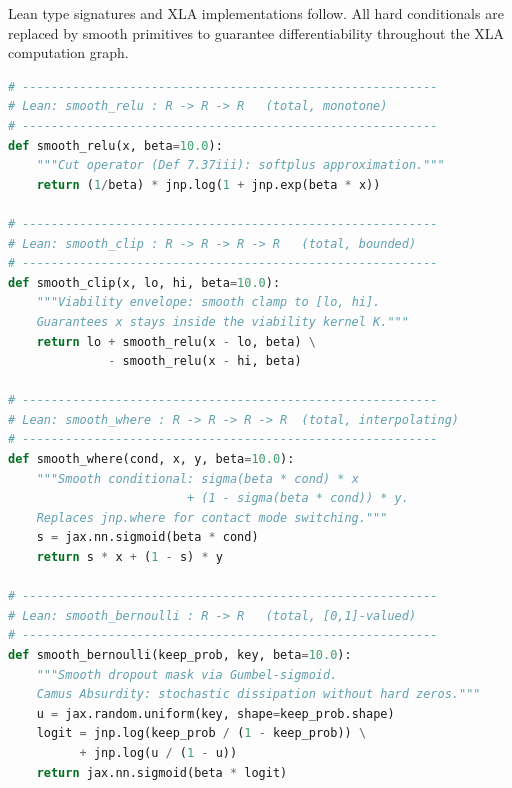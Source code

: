 \documentclass[11pt,a4paper]{article}
\theoremstyle{definition}
\theoremstyle{remark}
\begin{document}
Lean type signatures and XLA implementations follow. All hard conditionals are replaced by smooth primitives to guarantee differentiability throughout the XLA computation graph.

\begin{lstlisting}[language=Python,caption={Smooth primitives (differentiable everywhere under custom JVP)}]
# ----------------------------------------------------------
# Lean: smooth_relu : R -> R -> R   (total, monotone)
# ----------------------------------------------------------
def smooth_relu(x, beta=10.0):
    """Cut operator (Def 7.37iii): softplus approximation."""
    return (1/beta) * jnp.log(1 + jnp.exp(beta * x))

# ----------------------------------------------------------
# Lean: smooth_clip : R -> R -> R -> R   (total, bounded)
# ----------------------------------------------------------
def smooth_clip(x, lo, hi, beta=10.0):
    """Viability envelope: smooth clamp to [lo, hi].
    Guarantees x stays inside the viability kernel K."""
    return lo + smooth_relu(x - lo, beta) \
              - smooth_relu(x - hi, beta)

# ----------------------------------------------------------
# Lean: smooth_where : R -> R -> R -> R  (total, interpolating)
# ----------------------------------------------------------
def smooth_where(cond, x, y, beta=10.0):
    """Smooth conditional: sigma(beta * cond) * x
                         + (1 - sigma(beta * cond)) * y.
    Replaces jnp.where for contact mode switching."""
    s = jax.nn.sigmoid(beta * cond)
    return s * x + (1 - s) * y

# ----------------------------------------------------------
# Lean: smooth_bernoulli : R -> R   (total, [0,1]-valued)
# ----------------------------------------------------------
def smooth_bernoulli(keep_prob, key, beta=10.0):
    """Smooth dropout mask via Gumbel-sigmoid.
    Camus Absurdity: stochastic dissipation without hard zeros."""
    u = jax.random.uniform(key, shape=keep_prob.shape)
    logit = jnp.log(keep_prob / (1 - keep_prob)) \
          + jnp.log(u / (1 - u))
    return jax.nn.sigmoid(beta * logit)
\end{lstlisting}
\end{document}
